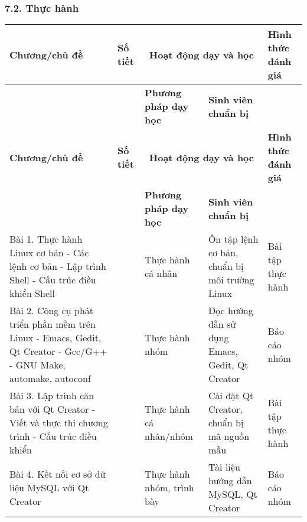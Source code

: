 \documentclass[a4paper,13pt]{article}
\begin{document}
\subsubsection*{7.2. Thực hành}
\begin{longtable}{|>{\centering\arraybackslash}p{3cm}|>{\centering\arraybackslash}p{1.5cm}|p{6cm}|>{\centering\arraybackslash}p{3cm}|>{\centering\arraybackslash}p{2cm}|}
\hline
\textbf{Chương/chủ đề} & \textbf{Số tiết} & \multicolumn{2}{c|}{\textbf{Hoạt động dạy và học}} & \textbf{Hình thức đánh giá} \\
\cline{3-4}
& & \textbf{Phương pháp dạy học} & \textbf{Sinh viên chuẩn bị} & \\
\hline
\endfirsthead
\hline
\textbf{Chương/chủ đề} & \textbf{Số tiết} & \multicolumn{2}{c|}{\textbf{Hoạt động dạy và học}} & \textbf{Hình thức đánh giá} \\
\cline{3-4}
& & \textbf{Phương pháp dạy học} & \textbf{Sinh viên chuẩn bị} & \\
\hline
\endhead
Bài 1. Thực hành Linux cơ bản
- Các lệnh cơ bản
- Lập trình Shell
- Cấu trúc điều khiển Shell & 5 & Thực hành cá nhân & Ôn tập lệnh cơ bản, chuẩn bị môi trường Linux & Bài tập thực hành \\
\hline
Bài 2. Công cụ phát triển phần mềm trên Linux
- Emacs, Gedit, Qt Creator
- Gcc/G++
- GNU Make, automake, autoconf & 5 & Thực hành nhóm & Đọc hướng dẫn sử dụng Emacs, Gedit, Qt Creator & Báo cáo nhóm \\
\hline
Bài 3. Lập trình căn bản với Qt Creator
- Viết và thực thi chương trình
- Cấu trúc điều khiển & 5 & Thực hành cá nhân/nhóm & Cài đặt Qt Creator, chuẩn bị mã nguồn mẫu & Bài tập thực hành \\
\hline
Bài 4. Kết nối cơ sở dữ liệu MySQL với Qt Creator & 5 & Thực hành nhóm, trình bày & Tài liệu hướng dẫn MySQL, Qt Creator & Báo cáo nhóm \\
\hline
\end{longtable}
\end{document}
